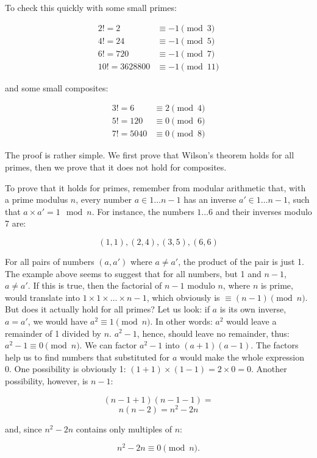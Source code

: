 \documentclass{scrreprt}
\begin{document}
To check this quickly with some small primes:

\begin{align*}
  2!  =   2 & \equiv -1 \pmod 3\\
  4!  =  24 & \equiv -1 \pmod 5\\
  6!  = 720 & \equiv -1 \pmod 7\\
  10! = 3628800 & \equiv -1 \pmod{11}
\end{align*}

and some small composites:

\begin{align*}
  3! =    6 & \equiv 2 \pmod 4\\
  5! =  120 & \equiv 0 \pmod 6\\
  7! = 5040 & \equiv 0 \pmod 8
\end{align*}

The proof is rather simple.
We first prove that Wilson's theorem holds for all primes,
then we prove that it does not hold for composites.

To prove that it holds for primes,
remember from modular arithmetic that,
with a prime modulus $n$, every number $a \in 1\dots n-1$
has an inverse $a' \in 1\dots n-1$, such that 
$a \times a' = 1 \mod n$.
For instance, the numbers $1\dots 6$ and their inverses
modulo 7 are:

\[
(1,1), (2,4), (3,5), (6,6)
\]

For all pairs of numbers $(a,a')$ where $a \neq a'$,
the product of the pair is just 1.
The example above seems to suggest 
that for all numbers, but 1 and $n-1$,
$a \neq a'$. 
If this is true, then the factorial of $n-1$
modulo $n$, where $n$ is prime,
would translate into $1 \times 1 \times \dots \times n-1$,
which obviously is $\equiv (n-1) \pmod n$.
But does it actually hold for all primes?
Let us look: if $a$ is its own inverse,
\ie\ $a = a'$, we would have
$a^2 \equiv 1 \pmod{n}$.
In other words: $a^2$ would leave a remainder
of 1 divided by $n$. $a^2 - 1$, hence, should leave
no remainder, thus: $a^2 - 1 \equiv 0 \pmod{n}$.
We can factor $a^2 - 1$ into $(a + 1) (a - 1)$.
The factors help us to find numbers that
substituted for $a$ would make the whole expression 0.
One possibility is obviously 1: 
$(1 + 1) \times (1-1) = 2 \times 0 = 0$.
Another possibility, however, is $n - 1$:

\[
(n - 1 + 1) (n-1-1) = 
\]
\[
n (n-2) = n^2-2n
\]

and, since $n^2 - 2n$ contains only multiples of $n$:

\[
n^2-2n \equiv 0 \pmod{n}.
\]
\end{document}
